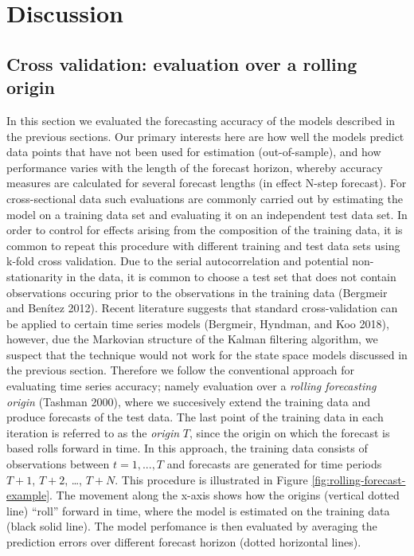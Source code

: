 \documentclass[]{article}
\begin{document}
\section{Discussion}\label{discussion}

\subsection{Cross validation: evaluation over a rolling
origin}\label{cross-validation-evaluation-over-a-rolling-origin}

In this section we evaluated the forecasting accuracy of the models
described in the previous sections. Our primary interests here are how
well the models predict data points that have not been used for
estimation (out-of-sample), and how performance varies with the length
of the forecast horizon, whereby accuracy measures are calculated for
several forecast lengths (in effect N-step forecast). For
cross-sectional data such evaluations are commonly carried out by
estimating the model on a training data set and evaluating it on an
independent test data set. In order to control for effects arising from
the composition of the training data, it is common to repeat this
procedure with different training and test data sets using k-fold cross
validation. Due to the serial autocorrelation and potential
non-stationarity in the data, it is common to choose a test set that
does not contain observations occuring prior to the observations in the
training data (Bergmeir and Benítez 2012). Recent literature suggests
that standard cross-validation can be applied to certain time series
models (Bergmeir, Hyndman, and Koo 2018), however, due the Markovian
structure of the Kalman filtering algorithm, we suspect that the
technique would not work for the state space models discussed in the
previous section. Therefore we follow the conventional approach for
evaluating time series accuracy; namely evaluation over a
\textit{rolling forecasting origin} (Tashman 2000), where we succesively
extend the training data and produce forecasts of the test data. The
last point of the training data in each iteration is referred to as the
\textit{origin} \(T\), since the origin on which the forecast is based
rolls forward in time. In this approach, the training data consists of
observations between \(t = 1, ..., T\) and forecasts are generated for
time periods \(T+1\), \(T+2\), \ldots{}, \(T+N\). This procedure is
illustrated in Figure \ref{fig:rolling-forecast-example}. The movement
along the x-axis shows how the origins (vertical dotted line) ``roll''
forward in time, where the model is estimated on the training data
(black solid line). The model perfomance is then evaluated by averaging
the prediction errors over different forecast horizon (dotted horizontal
lines).
\end{document}
